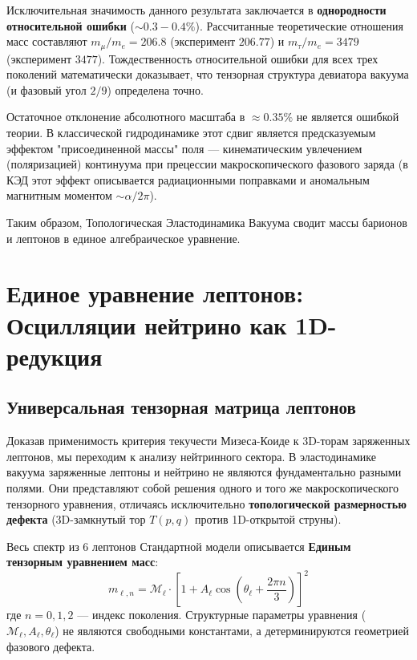 \documentclass[12pt,a4paper]{article}
\begin{document}
	Исключительная значимость данного результата заключается в \textbf{однородности относительной ошибки} ($\sim 0.3 - 0.4\%$). Рассчитанные теоретические отношения масс составляют $m_\mu/m_e = 206.8$ (эксперимент $206.77$) и $m_\tau/m_e = 3479$ (эксперимент $3477$). 
	Тождественность относительной ошибки для всех трех поколений математически доказывает, что тензорная структура девиатора вакуума (и фазовый угол $2/9$) определена точно. 
	
	Остаточное отклонение абсолютного масштаба в $\approx 0.35\%$ не является ошибкой теории. В классической гидродинамике этот сдвиг является предсказуемым эффектом "присоединенной массы" поля — кинематическим увлечением (поляризацией) континуума при прецессии макроскопического фазового заряда (в КЭД этот эффект описывается радиационными поправками и аномальным магнитным моментом $\sim \alpha / 2\pi$). 
	
	Таким образом, Топологическая Эластодинамика Вакуума сводит массы барионов и лептонов в единое алгебраическое уравнение.
	
	\section{Единое уравнение лептонов:\\ Осцилляции нейтрино как 1D-редукция}
	
	\subsection{Универсальная тензорная матрица лептонов}
	Доказав применимость критерия текучести Мизеса-Коиде к 3D-торам заряженных лептонов, мы переходим к анализу нейтринного сектора. В эластодинамике вакуума заряженные лептоны и нейтрино не являются фундаментально разными полями. Они представляют собой решения одного и того же макроскопического тензорного уравнения, отличаясь исключительно \textbf{топологической размерностью дефекта} (3D-замкнутый тор $T(p,q)$ против 1D-открытой струны).
	
	Весь спектр из 6 лептонов Стандартной модели описывается \textbf{Единым тензорным уравнением масс}:
	\begin{equation}
		m_{\ell, n} = \mathcal{M}_\ell \cdot \left[ 1 + A_\ell \cos\left(\theta_\ell + \frac{2\pi n}{3}\right) \right]^2
	\end{equation}
	где $n = 0, 1, 2$ — индекс поколения. Структурные параметры уравнения ($\mathcal{M}_\ell, A_\ell, \theta_\ell$) не являются свободными константами, а детерминируются геометрией фазового дефекта.
	
\end{document}
